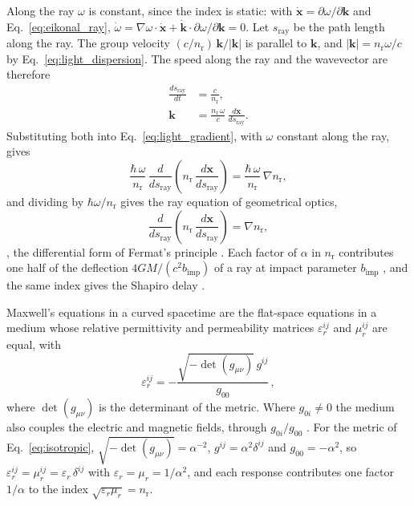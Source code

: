 \documentclass[aps,prd,onecolumn,tightenlines,nofootinbib,notitlepage,11pt,floatfix]{revtex4-2}
\theoremstyle{indentedtheorem}
\begin{document}
Along the ray $\omega$ is constant, since the index is static: with $\dot{\mathbf{x}}=\partial\omega/\partial\mathbf{k}$ and Eq.~\eqref{eq:eikonal_ray}, $\dot{\omega}=\nabla\omega\cdot\dot{\mathbf{x}}+\dot{\mathbf{k}}\cdot\partial\omega/\partial\mathbf{k}=0$. Let $s_\text{ray}$ be the path length along the ray. The group velocity $(c/n_\text{r})\,\mathbf{k}/|\mathbf{k}|$ is parallel to $\mathbf{k}$, and $|\mathbf{k}|=n_\text{r}\omega/c$ by Eq.~\eqref{eq:light_dispersion}. The speed along the ray and the wavevector are therefore
\begin{align*}
    \frac{ds_\text{ray}}{dt} &= \frac{c}{n_\text{r}} , \\
    \mathbf{k} &= \frac{n_\text{r}\,\omega}{c}\,\frac{d\mathbf{x}}{ds_\text{ray}} .
\end{align*}
Substituting both into Eq.~\eqref{eq:light_gradient}, with $\omega$ constant along the ray, gives
\[
    \frac{\hbar\,\omega}{n_\text{r}}\,\frac{d}{ds_\text{ray}}\!\left(n_\text{r} \, \frac{d\mathbf{x}}{ds_\text{ray}}\right) = \frac{\hbar \, \omega}{n_\text{r}}\,\nabla n_\text{r} ,
\]
and dividing by $\hbar\omega/n_\text{r}$ gives the ray equation of geometrical optics,
\begin{equation}
    \frac{d}{ds_\text{ray}}\!\left(n_\text{r} \, \frac{d\mathbf{x}}{ds_\text{ray}}\right) = \nabla n_\text{r} ,
    \label{eq:optical_path}
\end{equation}
\citep{Evans1986Optics}, the differential form of Fermat's principle \citep{Fermat1662Refractions}. Each factor of $\alpha$ in $n_\text{r}$ contributes one half of the deflection $4GM/(c^2b_\text{imp})$ of a ray at impact parameter $b_\text{imp}$ \citep{MTW1973Gravitation}, and the same index gives the Shapiro delay \citep{Shapiro1964Fourth,Bertotti2003Test}.

Maxwell's equations in a curved spacetime are the flat-space equations in a medium whose relative permittivity and permeability matrices $\varepsilon_r^{ij}$ and $\mu_r^{ij}$ are equal, with
\begin{equation}
    \varepsilon_r^{ij} = -\frac{\sqrt{-\det(g_{\mu\nu})}\,g^{ij}}{g_{00}} \, ,
    \label{eq:constitutive_map}
\end{equation}
where $\det(g_{\mu\nu})$ is the determinant of the metric. Where $g_{0i}\neq0$ the medium also couples the electric and magnetic fields, through $g_{0i}/g_{00}$ \citep{Gordon1923Refraction,Plebanski1960Electromagnetic,Leonhardt2006General}. For the metric of Eq.~\eqref{eq:isotropic}, $\sqrt{-\det(g_{\mu\nu})}=\alpha^{-2}$, $g^{ij}=\alpha^2\delta^{ij}$ and $g_{00}=-\alpha^2$, so $\varepsilon_r^{ij}=\mu_r^{ij}=\varepsilon_r\,\delta^{ij}$ with $\varepsilon_r=\mu_r=1/\alpha^2$, and each response contributes one factor $1/\alpha$ to the index $\sqrt{\varepsilon_r\mu_r}=n_\text{r}$.
\end{document}
